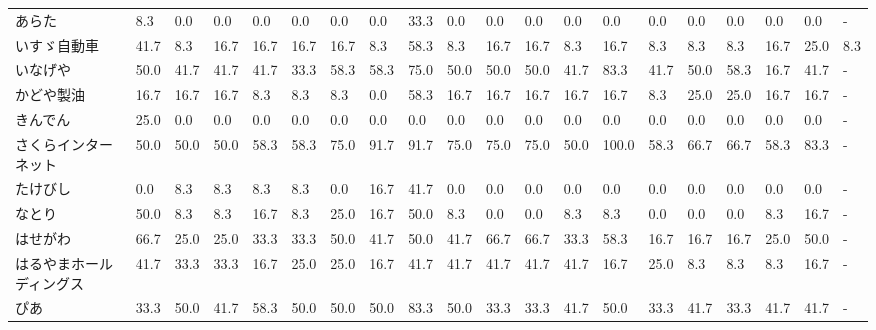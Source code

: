 \documentclass[a4paper，11pt]{jsarticle}
\begin{document}
\begin{longtable}[c]{lp{3mm}p{3mm}p{3mm}p{3mm}p{3mm}p{3mm}p{3mm}p{3mm}p{3mm}p{3mm}p{3mm}p{3mm}p{3mm}p{3mm}p{3mm}p{3mm}p{3mm}p{3mm}p{3mm}}
\bottomrule
\endfoot
\bottomrule
\endlastfoot
あらた             &    8.3 &    0.0 &       0.0 &       0.0 &        0.0 &    0.0 &    0.0 &   33.3 &     0.0 &     0.0 &    0.0 &   0.0 &    0.0 &     0.0 &     0.0 &   0.0 &   0.0 &   0.0 &     - \\
いすゞ自動車          &   41.7 &    8.3 &      16.7 &      16.7 &       16.7 &   16.7 &    8.3 &   58.3 &     8.3 &    16.7 &   16.7 &   8.3 &   16.7 &     8.3 &     8.3 &   8.3 &  16.7 &  25.0 &   8.3 \\
いなげや            &   50.0 &   41.7 &      41.7 &      41.7 &       33.3 &   58.3 &   58.3 &   75.0 &    50.0 &    50.0 &   50.0 &  41.7 &   83.3 &    41.7 &    50.0 &  58.3 &  16.7 &  41.7 &     - \\
かどや製油           &   16.7 &   16.7 &      16.7 &       8.3 &        8.3 &    8.3 &    0.0 &   58.3 &    16.7 &    16.7 &   16.7 &  16.7 &   16.7 &     8.3 &    25.0 &  25.0 &  16.7 &  16.7 &     - \\
きんでん            &   25.0 &    0.0 &       0.0 &       0.0 &        0.0 &    0.0 &    0.0 &    0.0 &     0.0 &     0.0 &    0.0 &   0.0 &    0.0 &     0.0 &     0.0 &   0.0 &   0.0 &   0.0 &     - \\
さくらインターネット      &   50.0 &   50.0 &      50.0 &      58.3 &       58.3 &   75.0 &   91.7 &   91.7 &    75.0 &    75.0 &   75.0 &  50.0 &  100.0 &    58.3 &    66.7 &  66.7 &  58.3 &  83.3 &     - \\
たけびし            &    0.0 &    8.3 &       8.3 &       8.3 &        8.3 &    0.0 &   16.7 &   41.7 &     0.0 &     0.0 &    0.0 &   0.0 &    0.0 &     0.0 &     0.0 &   0.0 &   0.0 &   0.0 &     - \\
なとり             &   50.0 &    8.3 &       8.3 &      16.7 &        8.3 &   25.0 &   16.7 &   50.0 &     8.3 &     0.0 &    0.0 &   8.3 &    8.3 &     0.0 &     0.0 &   0.0 &   8.3 &  16.7 &     - \\
はせがわ            &   66.7 &   25.0 &      25.0 &      33.3 &       33.3 &   50.0 &   41.7 &   50.0 &    41.7 &    66.7 &   66.7 &  33.3 &   58.3 &    16.7 &    16.7 &  16.7 &  25.0 &  50.0 &     - \\
はるやまホールディングス    &   41.7 &   33.3 &      33.3 &      16.7 &       25.0 &   25.0 &   16.7 &   41.7 &    41.7 &    41.7 &   41.7 &  41.7 &   16.7 &    25.0 &     8.3 &   8.3 &   8.3 &  16.7 &     - \\
ぴあ              &   33.3 &   50.0 &      41.7 &      58.3 &       50.0 &   50.0 &   50.0 &   83.3 &    50.0 &    33.3 &   33.3 &  41.7 &   50.0 &    33.3 &    41.7 &  33.3 &  41.7 &  41.7 &     - \\

\end{longtable}
\end{document}
